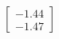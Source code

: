 \documentclass[preview]{standalone}
\begin{document}
\begin{align*}
\begin{bmatrix} -1.44 \\ -1.47 \end{bmatrix}
\end{align*}
\end{document}

